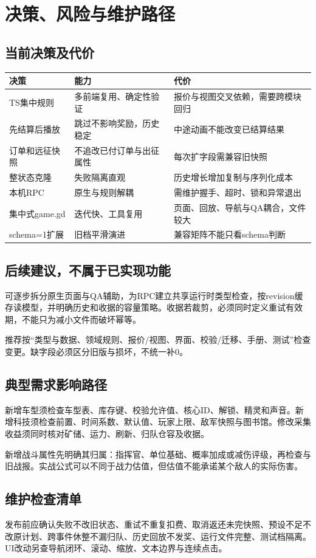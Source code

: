 \chapter{决策、风险与维护路径}
\section{当前决策及代价}
\begin{small}\begin{longtable}{@{}P{32mm}P{55mm}P{57mm}@{}}
\toprule 决策 & 能力 & 代价\\\midrule\endhead
TS集中规则 & 多前端复用、确定性验证 & 报价与视图交叉依赖，需要跨模块回归\\
先结算后播放 & 跳过不影响奖励，历史稳定 & 中途动画不能改变已结算结果\\
订单和远征快照 & 不追改已付订单与出征属性 & 每次扩字段需兼容旧快照\\
整状态克隆 & 失败隔离直观 & 历史增长增加复制与序列化成本\\
本机RPC & 原生与规则解耦 & 需维护握手、超时、锁和异常退出\\
集中式game.gd & 迭代快、工具复用 & 页面、回放、导航与QA耦合，文件较大\\
schema=1扩展 & 旧档平滑演进 & 兼容矩阵不能只看schema判断\\
\bottomrule\end{longtable}\end{small}

\section{后续建议，不属于已实现功能}
可逐步拆分原生页面与QA辅助，为RPC建立共享运行时类型检查，按revision缓存读模型，并明确历史和收据的容量策略。收据若裁剪，必须同时定义重试有效期，不能只为减小文件而破坏幂等。

推荐按“类型与数据、领域规则、报价/视图、界面、校验/迁移、手册、测试”检查变更。缺字段必须区分旧版与损坏，不统一补0。

\section{典型需求影响路径}
新增车型须检查车型表、库存键、校验允许值、核心ID、解锁、精灵和声音。新增科技须检查前置、时间系数、默认值、玩家上限、敌军快照与图书馆。修改采集收益须同时核对矿储、运力、刷新、归队仓容及收据。

新增战斗属性先明确其归属：指挥官、单位基础、概率加成或减伤评级，再检查与旧战报。实战公式可以不同于战力估值，但估值不能承诺某个敌人的实际伤害。

\section{维护检查清单}
发布前应确认失败不改旧状态、重试不重复扣费、取消返还未完快照、预设不足不改原计划、跨事件休整不漏归队、历史回放不发奖、运行文件完整、测试档隔离。UI改动另查导航闭环、滚动、缩放、文本边界与连续点击。
